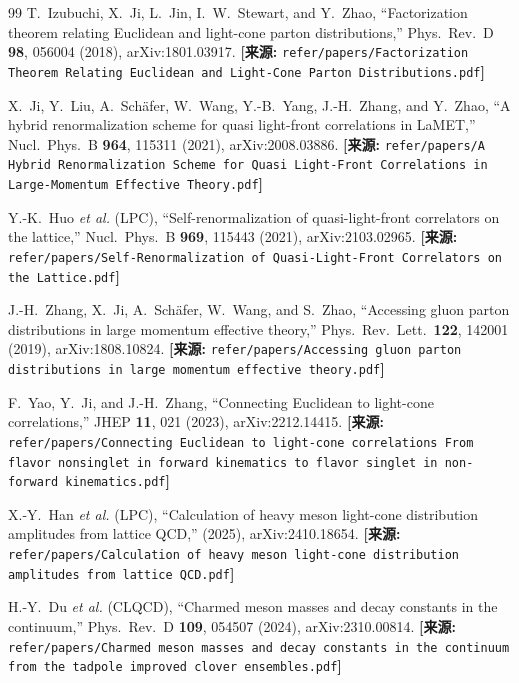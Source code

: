 \documentclass[12pt,a4paper]{ctexart}
\theoremstyle{definition}
\begin{document}
\begin{thebibliography}{99}
T.~Izubuchi, X.~Ji, L.~Jin, I.~W.~Stewart, and Y.~Zhao,
``Factorization theorem relating Euclidean and light-cone parton distributions,''
Phys.\ Rev.\ D \textbf{98}, 056004 (2018), arXiv:1801.03917.
\quad\textbf{[来源:} \texttt{refer/papers/Factorization Theorem Relating Euclidean and Light-Cone Parton Distributions.pdf}\textbf{]}

X.~Ji, Y.~Liu, A.~Sch\"afer, W.~Wang, Y.-B.~Yang, J.-H.~Zhang, and Y.~Zhao,
``A hybrid renormalization scheme for quasi light-front correlations in LaMET,''
Nucl.\ Phys.\ B \textbf{964}, 115311 (2021), arXiv:2008.03886.
\quad\textbf{[来源:} \texttt{refer/papers/A Hybrid Renormalization Scheme for Quasi Light-Front Correlations in Large-Momentum Effective Theory.pdf}\textbf{]}

Y.-K.~Huo \textit{et al.} (LPC),
``Self-renormalization of quasi-light-front correlators on the lattice,''
Nucl.\ Phys.\ B \textbf{969}, 115443 (2021), arXiv:2103.02965.
\quad\textbf{[来源:} \texttt{refer/papers/Self-Renormalization of Quasi-Light-Front Correlators on the Lattice.pdf}\textbf{]}

J.-H.~Zhang, X.~Ji, A.~Sch\"afer, W.~Wang, and S.~Zhao,
``Accessing gluon parton distributions in large momentum effective theory,''
Phys.\ Rev.\ Lett.\ \textbf{122}, 142001 (2019), arXiv:1808.10824.
\quad\textbf{[来源:} \texttt{refer/papers/Accessing gluon parton distributions in large momentum effective theory.pdf}\textbf{]}

F.~Yao, Y.~Ji, and J.-H.~Zhang,
``Connecting Euclidean to light-cone correlations,''
JHEP \textbf{11}, 021 (2023), arXiv:2212.14415.
\quad\textbf{[来源:} \texttt{refer/papers/Connecting Euclidean to light-cone correlations From flavor nonsinglet in forward kinematics to flavor singlet in non-forward kinematics.pdf}\textbf{]}

X.-Y.~Han \textit{et al.} (LPC),
``Calculation of heavy meson light-cone distribution amplitudes from lattice QCD,''
(2025), arXiv:2410.18654.
\quad\textbf{[来源:} \texttt{refer/papers/Calculation of heavy meson light-cone distribution amplitudes from lattice QCD.pdf}\textbf{]}

H.-Y.~Du \textit{et al.} (CLQCD),
``Charmed meson masses and decay constants in the continuum,''
Phys.\ Rev.\ D \textbf{109}, 054507 (2024), arXiv:2310.00814.
\quad\textbf{[来源:} \texttt{refer/papers/Charmed meson masses and decay constants in the continuum from the tadpole improved clover ensembles.pdf}\textbf{]}


\end{thebibliography}
\end{document}
